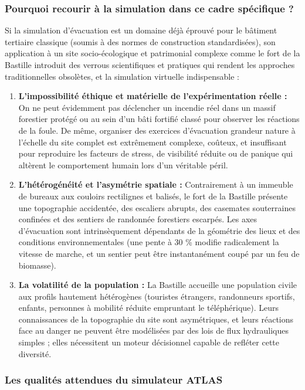 \documentclass{article}
\begin{document}
\subsubsection{Pourquoi recourir à la simulation dans ce cadre spécifique ?}

Si la simulation d'évacuation est un domaine déjà éprouvé pour le bâtiment tertiaire classique (soumis à des normes de construction standardisées), son application à un site socio-écologique et patrimonial complexe comme le fort de la Bastille introduit des verrous scientifiques et pratiques qui rendent les approches traditionnelles obsolètes, et la simulation virtuelle indispensable :

\begin{enumerate}
    \item \textbf{L'impossibilité éthique et matérielle de l'expérimentation réelle :} On ne peut évidemment pas déclencher un incendie réel dans un massif forestier protégé ou au sein d'un bâti fortifié classé pour observer les réactions de la foule. De même, organiser des exercices d'évacuation grandeur nature à l'échelle du site complet est extrêmement complexe, coûteux, et insuffisant pour reproduire les facteurs de stress, de visibilité réduite ou de panique qui altèrent le comportement humain lors d'un véritable péril.
    \item \textbf{L'hétérogénéité et l'asymétrie spatiale :} Contrairement à un immeuble de bureaux aux couloirs rectilignes et balisés, le fort de la Bastille présente une topographie accidentée, des escaliers abrupts, des casemates souterraines confinées et des sentiers de randonnée forestiers escarpés. Les axes d'évacuation sont intrinsèquement dépendants de la géométrie des lieux et des conditions environnementales (une pente à 30 \% modifie radicalement la vitesse de marche, et un sentier peut être instantanément coupé par un feu de biomasse).
    \item \textbf{La volatilité de la population :} La Bastille accueille une population civile aux profils hautement hétérogènes (touristes étrangers, randonneurs sportifs, enfants, personnes à mobilité réduite empruntant le téléphérique). Leurs connaissances de la topographie du site sont asymétriques, et leurs réactions face au danger ne peuvent être modélisées par des lois de flux hydrauliques simples ; elles nécessitent un moteur décisionnel capable de refléter cette diversité.
\end{enumerate}

\subsubsection{Les qualités attendues du simulateur ATLAS}
\end{document}

